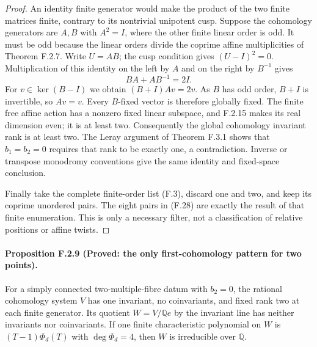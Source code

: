 \begin{proof}
An identity finite generator would make the product of the
two finite matrices finite, contrary to its nontrivial
unipotent cusp.  Suppose the cohomology generators are
$A,B$ with $A^2=I$, where the other finite linear order is
odd.  It must be odd because the linear orders divide the
coprime affine multiplicities of Theorem F.2.7.
Write $U=AB$; the cusp condition gives $(U-I)^2=0$.
Multiplication of this identity on the left by $A$ and on
the right by $B^{-1}$ gives
\[
 BA+AB^{-1}=2I.
 \tag{F.29}
\]
For $v\in\ker(B-I)$ we obtain $(B+I)Av=2v$.
As $B$ has odd order, $B+I$ is invertible, so $Av=v$.
Every $B$-fixed vector is therefore globally fixed.
The finite free affine action has a nonzero fixed
linear subspace, and F.2.15 makes its real dimension even; it is
at least two.  Consequently the global cohomology invariant
rank is at least two.  The Leray argument of Theorem F.3.1
shows that $b_1=b_2=0$ requires that rank to be exactly one,
a contradiction.  Inverse or transpose monodromy conventions
give the same identity and fixed-space conclusion.

Finally take the complete finite-order list (F.3), discard
one and two, and keep its coprime unordered pairs.
The eight pairs in (F.28) are exactly the result of that
finite enumeration.  This is only a necessary filter, not
a classification of relative positions or affine twists.
\end{proof}

\paragraph{Proposition F.2.9 (Proved: the only first-cohomology pattern for two points).}
For a simply connected two-multiple-fibre datum with $b_2=0$,
the rational
cohomology system $V$ has one invariant, no coinvariants,
and fixed rank two at each finite generator.  Its quotient
$W=V/\mathbb Qe$ by the invariant line has neither invariants
nor coinvariants.  If one finite characteristic polynomial
on $W$ is $(T-1)\Phi_d(T)$ with $\deg\Phi_d=4$, then $W$
is irreducible over $\mathbb Q$.

